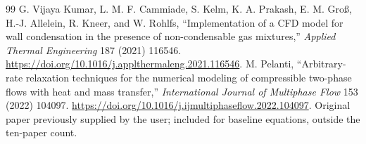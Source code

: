 \documentclass[11pt,letterpaper]{article}
\begin{document}
\begin{thebibliography}{99}
 G. Vijaya Kumar, L. M. F. Cammiade, S. Kelm, K. A. Prakash, E. M. Gro\ss{}, H.-J. Allelein, R. Kneer, and W. Rohlfs, ``Implementation of a CFD model for wall condensation in the presence of non-condensable gas mixtures,'' \emph{Applied Thermal Engineering} 187 (2021) 116546. \url{https://doi.org/10.1016/j.applthermaleng.2021.116546}.
 M. Pelanti, ``Arbitrary-rate relaxation techniques for the numerical modeling of compressible two-phase flows with heat and mass transfer,'' \emph{International Journal of Multiphase Flow} 153 (2022) 104097. \url{https://doi.org/10.1016/j.ijmultiphaseflow.2022.104097}. Original paper previously supplied by the user; included for baseline equations, outside the ten-paper count.
\end{thebibliography}
\end{document}
